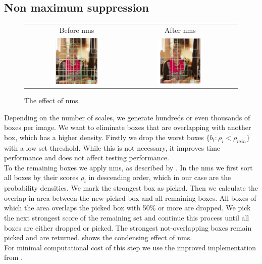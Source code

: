 \subsection{Non maximum suppression}
\label{sec:pipeline:eval:nms}
\begin{figure}[htb]
    \begin{tabular}{ccc}
        Before \gls{nms} & After \gls{nms} \\[3pt]
        \includegraphics[width=0.47\textwidth]{figures/nms_before} &
        \includegraphics[width=0.47\textwidth]{figures/nms_after}
    \end{tabular}
	\caption{The effect of \acrfull{nms}.}
    \label{fig:nms}
\end{figure}
Depending on the number of scales, we generate hundreds or even thousands of boxes per image. We want to eliminate boxes that are overlapping with another box, which has a higher density. Firstly we drop the worst boxes $\{b_i: \rho_i < \rho_{min}\}$ with a low set threshold. While this is not necessary, it improves time performance and does not affect testing performance.\\
To the remaining boxes we apply \gls{nms}, as described by \citet{felzenszwalb_discriminatively_2008}. In the \gls{nms} we first sort all boxes by their scores $\rho_i$ in descending order, which in our case are the probability densities. We mark the strongest box as picked. Then we calculate the overlap in area between the new picked box and all remaining boxes. All boxes of which the area overlaps the picked box with 50\% or more are dropped. We pick the next strongest score of the remaining set and continue this process until all boxes are either dropped or picked. The strongest not-overlapping boxes remain picked and are returned.  shows the condensing effect of \gls{nms}.\\For minimal computational cost of this step we use the improved implementation from \citet{malisiewicz_ensemble_2011}.
